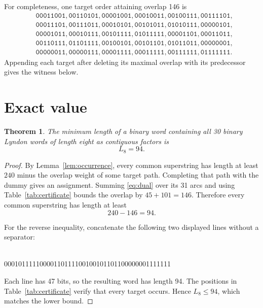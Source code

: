 \documentclass[11pt]{amsart}
\newtheorem{theorem}{Theorem}[section]
\theoremstyle{definition}
\begin{document}
For completeness, one target order attaining overlap 146 is
\begin{align*}
&\texttt{00011001},\texttt{00110101},\texttt{00001001},
\texttt{00010011},\texttt{00100111},\texttt{00111101},\\
&\texttt{00011101},\texttt{00111011},\texttt{00010101},
\texttt{00101011},\texttt{01010111},\texttt{00000101},\\
&\texttt{00001011},\texttt{00010111},\texttt{00101111},
\texttt{01011111},\texttt{00001101},\texttt{00011011},\\
&\texttt{00110111},\texttt{01101111},\texttt{00100101},
\texttt{00101101},\texttt{01011011},\texttt{00000001},\\
&\texttt{00000011},\texttt{00000111},\texttt{00001111},
\texttt{00011111},\texttt{00111111},\texttt{01111111}.
\end{align*}
Appending each target after deleting its maximal overlap with its predecessor
gives the witness below.

\section{Exact value}

\begin{theorem}\label{thm:main}
The minimum length of a binary word containing all 30 binary Lyndon words of
length eight as contiguous factors is
\[
 \boxed{L_8=94}.
\]
\end{theorem}

\begin{proof}
By Lemma~\ref{lem:occurrence}, every common superstring has length at least
$240$ minus the overlap weight of some target path.  Completing that path
with the dummy gives an assignment.  Summing \eqref{eq:dual} over its 31 arcs
and using Table~\ref{tab:certificate} bounds the overlap by $45+101=146$.
Therefore every common superstring has length at least
\[
 240-146=94.
\]

For the reverse inequality, concatenate the following two displayed lines
without a separator:
\begin{center}
\small{}\\
00010111110000110111100100101101100000001111111
\end{center}
Each line has 47 bits, so the resulting word has length 94.  The positions in
Table~\ref{tab:certificate} verify that every target occurs.  Hence $L_8\le94$,
which matches the lower bound.
\end{proof}
\end{document}
